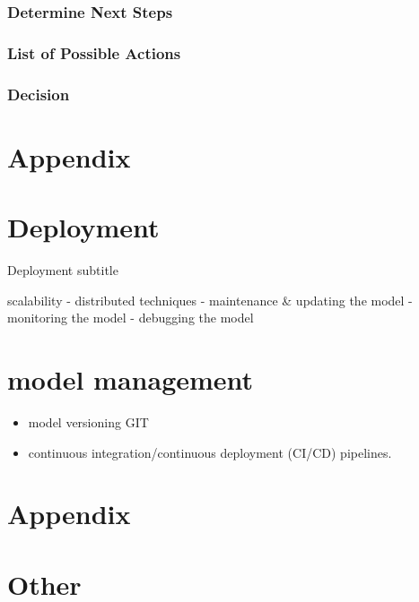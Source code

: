 \documentclass[
  american,
  10,
  a4paper,
]{book}
\providecommand{\tightlist}{%
  \setlength{\itemsep}{0pt}\setlength{\parskip}{0pt}}
\theoremstyle{definition}
\theoremstyle{remark}
\begin{document}
\subsection{Determine Next Steps}\label{determine-next-steps}

\subsection{List of Possible Actions}\label{list-of-possible-actions}

\subsection{Decision}\label{decision}

\chapter*{Appendix}\label{appendix-2}


\chapter{Deployment}\label{deployment-1}

Deployment subtitle

\hfill\break

scalability - distributed techniques - maintenance \& updating the model
- monitoring the model - debugging the model

\chapter{model management}\label{model-management}

\begin{itemize}
\tightlist
\item
  model versioning GIT
\item
  continuous integration/continuous deployment (CI/CD) pipelines.
\end{itemize}

\chapter*{Appendix}\label{appendix-3}


\chapter{Other}\label{other}
\end{document}
